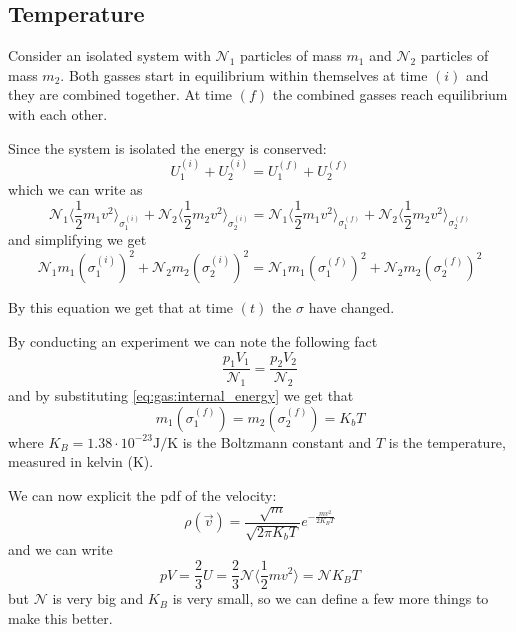 \documentclass[12pt]{extarticle}
\newcommand{\anglebraces}[1]{
    \langle #1 \rangle
}
\begin{document}
\subsection{Temperature}

Consider an isolated system with $\mathscr{N}_1$ particles of mass $m_1$ and $\mathscr{N}_2$ particles of mass $m_2$.
Both gasses start in equilibrium within themselves at time $(i)$ and they are combined together.
At time $(f)$ the combined gasses reach equilibrium with each other.

Since the system is isolated the energy is conserved:
\begin{equation}
    U_1^{(i)} + U_2^{(i)} = U_1^{(f)} + U_2^{(f)}
\end{equation}
which we can write as
\begin{equation}
    \mathscr{N}_1 \anglebraces{\frac{1}{2} m_1 v^2}_{\sigma_1^{(i)}} + \mathscr{N}_2 \anglebraces{\frac{1}{2} m_2 v^2}_{\sigma_2^{(i)}} = \mathscr{N}_1 \anglebraces{\frac{1}{2} m_1 v^2}_{\sigma_1^{(f)}} + \mathscr{N}_2 \anglebraces{\frac{1}{2} m_2 v^2}_{\sigma_2^{(f)}}
\end{equation}
and simplifying we get
\begin{equation}
    \mathscr{N}_1 m_1 \left(\sigma_1^{(i)}\right)^2 + \mathscr{N}_2 m_2 \left(\sigma_2^{(i)}\right)^2 = \mathscr{N}_1 m_1 \left(\sigma_1^{(f)}\right)^2 + \mathscr{N}_2 m_2 \left(\sigma_2^{(f)}\right)^2
\end{equation}

By this equation we get that at time $(t)$ the $\sigma$ have changed.

By conducting an experiment we can note the following fact
\begin{equation}
    \frac{p_1 V_1}{\mathscr{N}_1} = \frac{p_2 V_2}{\mathscr{N}_2}
\end{equation}
and by substituting \autoref{eq:gas:internal_energy} we get that
\begin{equation}
    m_1 \left( \sigma_1^{(f)} \right) = m_2 \left(\sigma_2^{(f)}\right) = K_b T
\end{equation}
where $K_B = 1.38 \cdot 10^{-23} \si{\joule \per \kelvin}$ is the Boltzmann constant and $T$ is the temperature, measured in kelvin ($\si{\kelvin}$).

We can now explicit the pdf of the velocity:
\begin{equation}
    \rho(\vec v) = \frac{\sqrt{m}}{\sqrt{2 \pi K_b T}} e^{- \frac{m v^2}{2 K_B T}}
\end{equation}
and we can write
\begin{equation}
    \label{eq:gas:initial_perfect}
    p V = \frac{2}{3}U = \frac{2}{3}\mathscr{N} \anglebraces{\frac{1}{2}mv^2} = \mathscr{N}K_B T
\end{equation}
but $\mathscr{N}$ is very big and $K_B$ is very small, so we can define a few more things to make this better.
\end{document}
